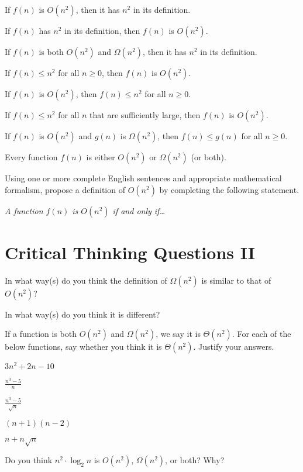 \documentclass{tufte-handout}
\begin{document}
\begin{questions}
\item If $f(n)$ is $O(n^2)$, then it has $n^2$ in its definition.
\item If $f(n)$ has $n^2$ in its definition, then $f(n)$ is $O(n^2)$.
\item If $f(n)$ is both $O(n^2)$ and $\Omega(n^2)$, then it has $n^2$
  in its definition.
\item If $f(n) \leq n^2$ for all $n \geq 0$, then $f(n)$ is $O(n^2)$.
\item If $f(n)$ is $O(n^2)$, then $f(n) \leq n^2$ for all $n \geq 0$.
\item If $f(n) \leq n^2$ for all $n$ that are sufficiently large, then
  $f(n)$ is $O(n^2)$.
\item If $f(n)$ is $O(n^2)$ and $g(n)$ is $\Omega(n^2)$, then $f(n)
  \leq g(n)$ for all $n \geq 0$.
\item Every function $f(n)$ is either $O(n^2)$ or $\Omega(n^2)$ (or
  both).
  \newpage
\item Using one or more complete English sentences and appropriate
  mathematical formalism, propose a definition of $O(n^2)$ by
  completing the following statement.

  \emph{A function $f(n)$ is $O(n^2)$ if and only if\dots}
\end{questions}

\pause



\section{Critical Thinking Questions II}

\begin{questions}
\item In what way(s) do you think the definition of $\Omega(n^2)$ is similar to
  that of $O(n^2)$?
\item In what way(s) do you think it is different?
\item If a function is both $O(n^2)$ and $\Omega(n^2)$, we say it is
  $\Theta(n^2)$.
  For each of the below functions, say whether you
  think it is $\Theta(n^2)$.  Justify your answers.
  \begin{subquestions}
  \item $3n^2 + 2n - 10$
  \item $\displaystyle \frac{n^3 - 5}{n}$
  \item $\displaystyle \frac{n^3 - 5}{\sqrt n}$
  \item $(n+1)(n-2)$
  \item $n + n \sqrt n$
  \end{subquestions}
\item Do you think $n^2 \cdot \log_2 n$ is $O(n^2)$, $\Omega(n^2)$, or
  both?  Why?
\end{questions}
\end{document}
